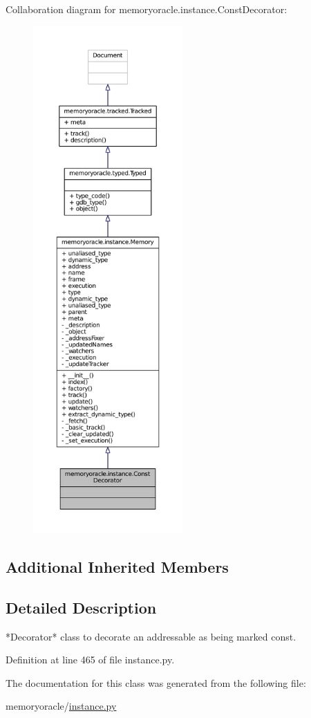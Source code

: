 Collaboration diagram for memoryoracle.\+instance.\+Const\+Decorator\+:
\nopagebreak
\begin{figure}[H]
\begin{center}
\leavevmode
\includegraphics[height=550pt]{classmemoryoracle_1_1instance_1_1ConstDecorator__coll__graph}
\end{center}
\end{figure}
\subsection*{Additional Inherited Members}


\subsection{Detailed Description}
\begin{DoxyVerb}*Decorator* class to decorate an addressable as being marked const.
\end{DoxyVerb}
 

Definition at line 465 of file instance.\+py.



The documentation for this class was generated from the following file\+:\begin{DoxyCompactItemize}
\item 
memoryoracle/\hyperlink{instance_8py}{instance.\+py}\end{DoxyCompactItemize}

